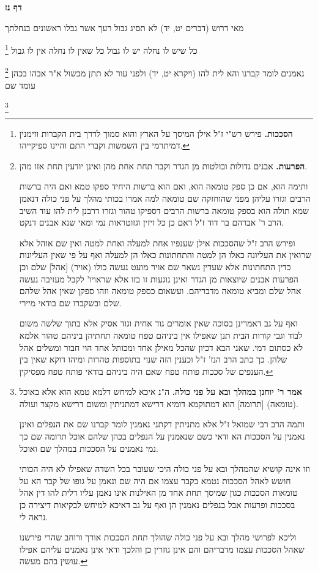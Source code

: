 \documentclass[12pt, openany]{book}
\newcommand{\sethebfont}{
\fontsize{10.5pt}{21.0pt} \selectfont
}
\newcommand{\twocol}[1]{
	{\sethebfont \begin{multicols}{2}
			#1
	\end{multicols}}	
}
\newcommand{\sectname}{}
\newcommand{\newsection}[1]{
	\addcontentsline{toc}{section}{#1}
	\renewcommand{\sectname}{#1}	
	\vspace{-\baselineskip}
	\begin{center}
		\textbf{%
\fontsize{16pt}{16pt}\selectfont
			#1}
	\end{center}
	\vspace{-\baselineskip}
	\nopagebreak
}
\newcommand{\footnotecomment}[1]{
	\renewcommand\thefootnote{}
	\footnote{#1}}
\newcommand{\commenta}[1]{\footnotecomment{#1}}
\begin{document}
\newsection{דף נז}
\twocol{מאי דרוש (דברים יט, יד) לא תסיג גבול רעך אשר גבלו ראשונים בנחלתך
\commenta{\textbf{הסככות.} פירש רש"י ז"ל אילן המיסך על הארץ והוא סמוך לדרך בית הקברות וזימנין דמיתרמי בין השמשות וקברי התם והיינו ספיקייהו. }
כל שיש לו נחלה יש לו גבול כל שאין לו נחלה אין לו גבול 
\commenta{\textbf{הפרעות.} אבנים גדולות ובולטות מן הגדר וקבר תחת אחת מהן ואינן יודעין תחת אזו מהן.\par ותימה הוא, אם כן ספק טומאה הוא, ואם הוא ברשות היחיד ספקו טמא ואם היה ברשות הרבים וגזרו עליהן מפני שהוחזקה שם טומאה למה אמרו בכותי מהלך על פני כולה דנאמן שמא תולה הוא בספק טומאה ברשות הרבים דספיקו טהור וגזרו דרבנן לית להו עוד השיב הרב ר' אברהם בר דוד ז"ל דאם כן כל זיזין וגזוטראות נמי ומאי שנא אבנים דנקט.\par ופירש הרב ז"ל שהסככות אילן שענפיו אחת למעלה ואחת למטה ואין שם אוהל אלא שרואין את העליונה כאלו הן למטה והתחתונות כאלו הן למעלה ואף על פי שאין העליונות כדין התחתונות אלא שעדין נשאר שם אויר מועט נעשה כולו (אויר) [אהל] שלם וכן הפרעות אבנים שיוצאות מן הגדר ואינן נוגעות זו בזו אלא שראויו' לקבל מעזיבה נעשה אהל שלם ומביא טומאה מדבריהם. ועשאום כספק טומאה וזהו ספקן שאין אהל שלהם שלם ובשקברו שם בודאי מיירי.\par ואף על גב דאמרינן בסוכה שאין אומרים גוד אחית וגוד אסיק אלא בתוך שלשה משום לבוד וגבי קורות הבית תנן שאפילו אין ביניהם טפח טומאה תחתיהן ביניהם טהור אלמא לא כסתום דמי. שאני הבא דכיון שהכל מאילן אחד ומכותל אחד הוי חבור ומשלים אהל שלהן. כך כתב הרב הנז' ז"ל וכענין הזה שנוי בתוספות טהרות ומיהו דוקא שאין בין הענפים של סככות פותח טפח שאם היה ביניהם בודאי פותח טפח מפסיקין. }
נאמנים לומר קברנו והא לית להו (ויקרא יט, יד) ולפני עור לא תתן מכשול א"ר אבהו בכהן עומד שם 
\commenta{\textbf{אמר ר' יוחנן במהלך ובא על פני כולה.} ה"נ איכא למיחש דלמא טמא הוא אלא באוכל (טומאה) [תרומה] הוא דמתוקמא דומיא דרישא דמתניתין ומשום דרישא מקצר ועולה.\par ותמה הרב רבי שמואל ז"ל אלא מתניתין דקתני נאמנין לומר קברנו שם את הנפלים ואינן נאמנין על הסככות הא ודאי כשם שנאמנין על הנפלים בכהן שלהם אוכל תרומה שם כך נמי נאמנים על הסככות במהלך שם ואוכל.\par וזו אינה קושיא שהמהלך ובא על פני כולה היכי שעובר בכל השדה שאפילו לא היה הכותי חושש לאהל הסככות נטמא בקבר עצמו אם היה שם ונאמן על גופו של קבר הא על טומאות הסככות כגון שמיסך תחת אחד מן האילנות אינו נאמן עליו דלית להו דין אהל בסככות ופרעות אבל בנפלים נאמנין הן ואף על גב דאיכא למיחש לבקיאות דיצירה כן נראה לי.\par וליכא לפרושי מהלך ובא על פני כולה שהולך תחת הסככות אורך ורוחב שהרי פירשנו שאהל הסככות עצמו מדבריהם והם אינן גוזרין כן והלכך ודאי אינן נאמנים עליהם אפילו עושין בהם מעשה. }
}
\end{document}
